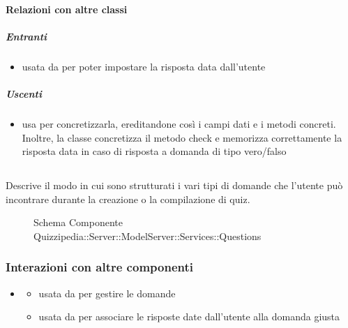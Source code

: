 \paragraph{Relazioni con altre classi}
\subparagraph{Entranti}
\begin{itemize}
\item usata da  per poter impostare la risposta data dall'utente
\end{itemize}
\subparagraph{Uscenti}
\begin{itemize}
\item usa  per concretizzarla, ereditandone così i campi dati e i metodi concreti. Inoltre, la classe concretizza il metodo check e memorizza correttamente la risposta data in caso di risposta a domanda di tipo vero/falso
\end{itemize}
\subsection{}
Descrive il modo in cui sono strutturati i vari tipi di domande che l'utente può incontrare durante la creazione o la compilazione di quiz.
\begin{figure}[H]
\centering
\noindent{}
\caption[Schema Componente Quizzipedia::Server::ModelServer::Services::Questions]{Schema Componente Quizzipedia::Server::ModelServer::Services::Questions}
\end{figure}
\subsubsection{Interazioni con altre componenti}
\begin{itemize}
\item {}
\begin{itemize}
\item usata da  per gestire le domande
\item usata da  per associare le risposte date dall'utente alla domanda giusta
\end{itemize}
\end{itemize}

